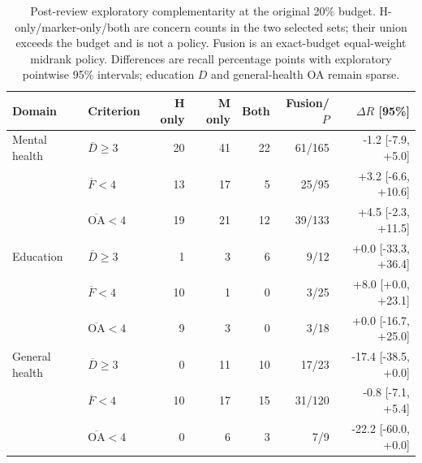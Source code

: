 \begin{table}[t]
\centering\small
\caption{Post-review exploratory complementarity at the original 20\% budget. H-only/marker-only/both are concern counts in the two selected sets; their union exceeds the budget and is not a policy. Fusion is an exact-budget equal-weight midrank policy. Differences are recall percentage points with exploratory pointwise 95\% intervals; education $D$ and general-health OA remain sparse.}
\label{tab:complementarity}
\begin{tabular}{llrrrrr}
\toprule
Domain & Criterion & H only & M only & Both & Fusion/$P$ & $\Delta R$ [95\%] \\
\midrule
Mental health & $\overline D\geq3$ & 20 & 41 & 22 & 61/165 & -1.2 [-7.9, +5.0] \\
 & $\overline F<4$ & 13 & 17 & 5 & 25/95 & +3.2 [-6.6, +10.6] \\
 & $\overline{\mathrm{OA}}<4$ & 19 & 21 & 12 & 39/133 & +4.5 [-2.3, +11.5] \\
Education & $\overline D\geq3$ & 1 & 3 & 6 & 9/12 & +0.0 [-33.3, +36.4] \\
 & $\overline F<4$ & 10 & 1 & 0 & 3/25 & +8.0 [+0.0, +23.1] \\
 & $\overline{\mathrm{OA}}<4$ & 9 & 3 & 0 & 3/18 & +0.0 [-16.7, +25.0] \\
General health & $\overline D\geq3$ & 0 & 11 & 10 & 17/23 & -17.4 [-38.5, +0.0] \\
 & $\overline F<4$ & 10 & 17 & 15 & 31/120 & -0.8 [-7.1, +5.4] \\
 & $\overline{\mathrm{OA}}<4$ & 0 & 6 & 3 & 7/9 & -22.2 [-60.0, +0.0] \\
\bottomrule
\end{tabular}
\end{table}
